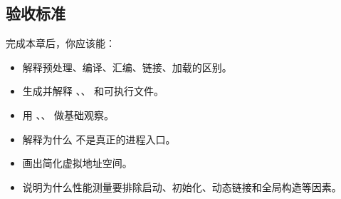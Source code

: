 \subsection{验收标准}

完成本章后，你应该能：

\begin{itemize}
  \item 解释预处理、编译、汇编、链接、加载的区别。
  \item 生成并解释 、、 和可执行文件。
  \item 用 、、 做基础观察。
  \item 解释为什么  不是真正的进程入口。
  \item 画出简化虚拟地址空间。
  \item 说明为什么性能测量要排除启动、初始化、动态链接和全局构造等因素。
\end{itemize}
